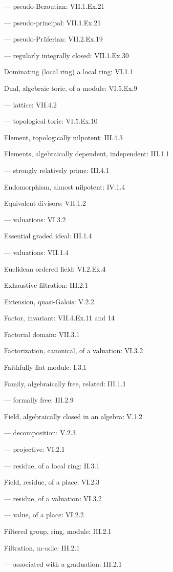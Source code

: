 --- pseudo-Bezoutian: VII.1.Ex.21

--- pseudo-principal: VII.1.Ex.21

--- pseudo-Prüferian: VII.2.Ex.19

--- regularly integrally closed: VII.1.Ex.30

Dominating (local ring) a local ring: VI.1.1

Dual, algebraic toric, of a module: VI.5.Ex.9

--- lattice: VII.4.2

--- topological toric: VI.5.Ex.10

Element, topologically nilpotent: III.4.3

Elements, algebraically dependent, independent: III.1.1

--- strongly relatively prime: III.4.1

Endomorphism, almost nilpotent: IV.1.4

Equivalent divisors: VII.1.2

--- valuations: VI.3.2

Essential graded ideal: III.1.4

--- valuations: VII.1.4

Euclidean ordered field: VI.2.Ex.4

Exhaustive filtration: III.2.1

Extension, quasi-Galois: V.2.2

Factor, invariant: VII.4.Ex.11 and 14

Factorial domain: VII.3.1

Factorization, canonical, of a valuation: VI.3.2

Faithfully flat module: I.3.1

Family, algebraically free, related: III.1.1

--- formally free: III.2.9

Field, algebraically closed in an algebra: V.1.2

--- decomposition: V.2.3

--- projective: VI.2.1

--- residue, of a local ring: II.3.1

Field, residue, of a place: VI.2.3

--- residue, of a valuation: VI.3.2

--- value, of a place: VI.2.2

Filtered group, ring, module: III.2.1

Filtration, m-adic: III.2.1

--- associated with a graduation: III.2.1

